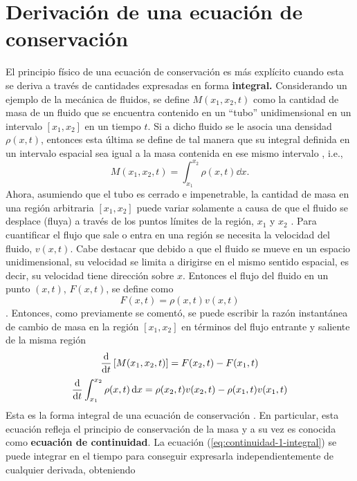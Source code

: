 \section{Derivación de una ecuación de conservación}
El principio físico de una ecuación de conservación es más explícito cuando esta se deriva a través de cantidades expresadas en forma \textbf{integral.} Considerando un ejemplo de la mecánica de fluidos, se define $M(x_1,x_2,t)$ como la cantidad de masa de un fluido que se encuentra contenido en un ``tubo'' unidimensional en un intervalo  $[x_1,x_2]$ en un tiempo $t$. Si a dicho fluido se le asocia una densidad $\rho(x,t)$, entonces esta última se define de tal manera que su integral definida en un intervalo espacial sea igual a la masa contenida en ese mismo intervalo \cite{Leveque}, i.e.,
\begin{equation}
	M(x_1, x_2, t) = \int_{x_1}^{x_2}\rho(x,t)\dd{x}.
\end{equation}
Ahora, asumiendo que el tubo es cerrado e impenetrable, la cantidad de masa en una región arbitraria $[x_1,x_2]$ puede variar solamente a causa de que el fluido se desplace (fluya) a través de los puntos límites de la región, $x_1$ y $x_2$ \cite{Leveque}. Para cuantificar el flujo que sale o entra en una región se necesita la velocidad del fluido, $v(x,t)$. Cabe destacar que debido a que el fluido se mueve en un espacio unidimensional, su velocidad se limita a dirigirse en el mismo sentido espacial, es decir, su velocidad tiene dirección sobre $x$. Entonces el flujo del fluido en un punto $(x,t)$, $F(x,t)$, se define como 
\begin{equation}
	F(x,t) = \rho(x,t)v(x,t)
\end{equation}\cite{Leveque}.
Entonces, como previamente se comentó, se puede escribir la razón instantánea de cambio de masa en la región $[x_1,x_2]$ en términos del flujo entrante y saliente de la misma región
\begin{equation}
	\dv{t}	\left[M(x_1, x_2, t)\right] = F(x_2,t) - F(x_1,t)
\end{equation}
\begin{equation}
	\dv{t}	\int_{x_1}^{x_2}\rho(x,t)\dd{x} = \rho(x_2,t)v(x_2,t) - \rho(x_1,t)v(x_1,t)
	\label{eq:continuidad-1-integral}
\end{equation}
Esta es la forma integral de una ecuación de conservación \cite{Leveque}. En particular, esta ecuación refleja el principio de conservación de la masa y a su vez es conocida como \textbf{ecuación de continuidad}. La ecuación (\ref{eq:continuidad-1-integral}) se puede integrar en el tiempo para conseguir expresarla independientemente de cualquier derivada, obteniendo
